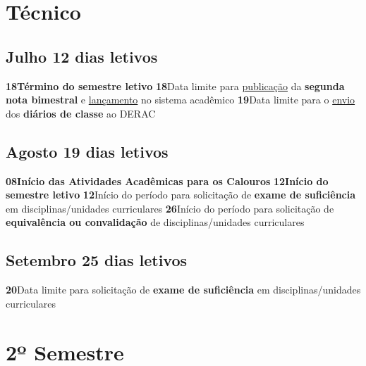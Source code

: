 \documentclass[thesis]{hmcposter}
\begin{document}
\begin{poster}
\section{\color{hmcorange}Técnico}\subsection{Julho \hfill 12 dias letivos}\textbf{18}\qquad \textbf{Término do semestre letivo} \newline \null\textbf{18}\qquad Data limite para \underline{publicação} da \textbf{segunda nota bimestral} e \underline{lançamento} no sistema acadêmico \newline \null\textbf{19}\qquad Data limite para o \underline{envio} dos \textbf{diários de classe} ao DERAC \newline \null\subsection{Agosto \hfill 19 dias letivos}\textbf{08}\qquad \textbf{Início das Atividades Acadêmicas para os Calouros} \newline \null\textbf{12}\qquad \textbf{Início do semestre letivo} \newline \null\textbf{12}\qquad Início do período para solicitação de \textbf{exame de suficiência} em disciplinas/unidades curriculares \newline \null\textbf{26}\qquad Início do período para solicitação de \textbf{equivalência ou convalidação} de disciplinas/unidades curriculares \newline \null\subsection{Setembro \hfill 25 dias letivos}\textbf{20}\qquad Data limite para solicitação de \textbf{exame de suficiência} em disciplinas/unidades curriculares \newline \null\vfill\null
\columnbreak
\section{\hfill \color{hmcorange}2º Semestre}

\end{poster}
\end{document}
